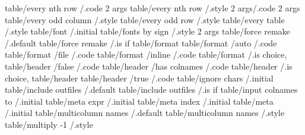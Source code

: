 table/every nth row                                                             /.code 2 args 
table/every nth row                                                             /.style 2 args/.code 2 args
table/every odd column                                                          /.style       
table/every odd row                                                             /.style       
table/every table                                                               /.style       
table/font                                                                      /.initial     
table/fonts by sign                                                             /.style 2 args
table/force remake                                                              /.default     
table/force remake                                                              /.is if       
table/format                       
table/format                       /auto                                        /.code        
table/format                       /file                                        /.code        
table/format                       /inline                                      /.code        
table/format                                                                    /.is choice,  
table/header                       /false                                       /.code        
table/header                       /has colnames                                /.code        
table/header                                                                    /.is choice,  
table/header                       
table/header                       /true                                        /.code        
table/ignore chars                                                              /.initial     
table/include outfiles                                                          /.default     
table/include outfiles                                                          /.is if       
table/input colnames to                                                         /.initial     
table/meta expr                                                                 /.initial     
table/meta index                                                                /.initial     
table/meta                                                                      /.initial     
table/multicolumn names                                                         /.default     
table/multicolumn names                                                         /.style       
table/multiply -1                                                               /.style       
